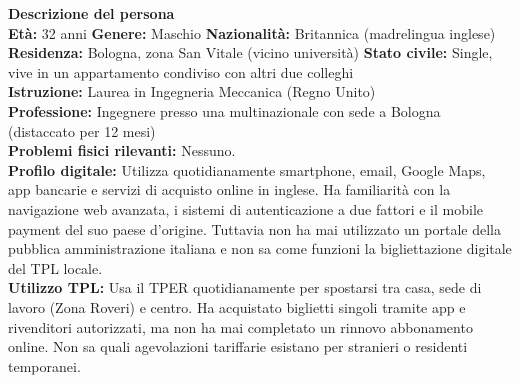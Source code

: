 ﻿\documentclass[11pt,a4paper]{article}
\begin{document}
\begin{tcolorbox}[base]
    \textbf{Descrizione del persona} \\[4pt]
    {\small
    \textbf{Et\`a:} 32 anni \hfill
    \textbf{Genere:} Maschio \hfill
    \textbf{Nazionalit\`a:} Britannica (madrelingua inglese) \\[2pt]
    \textbf{Residenza:} Bologna, zona San Vitale (vicino universit\`a) \hfill
    \textbf{Stato civile:} Single, vive in un appartamento condiviso con altri due colleghi \\[2pt]
    \textbf{Istruzione:} Laurea in Ingegneria Meccanica (Regno Unito) \\[2pt]
    \textbf{Professione:} Ingegnere presso una multinazionale con sede a Bologna (distaccato per 12 mesi) \\[2pt]
    \textbf{Problemi fisici rilevanti:} Nessuno. \\[2pt]
    \textbf{Profilo digitale:} Utilizza quotidianamente smartphone, email, Google Maps, app bancarie e servizi di acquisto online in inglese. Ha familiarit\`a con la navigazione web avanzata, i sistemi di autenticazione a due fattori e il mobile payment del suo paese d'origine. Tuttavia non ha mai utilizzato un portale della pubblica amministrazione italiana e non sa come funzioni la bigliettazione digitale del TPL locale. \\[2pt]
    \textbf{Utilizzo TPL:} Usa il TPER quotidianamente per spostarsi tra casa, sede di lavoro (Zona Roveri) e centro. Ha acquistato biglietti singoli tramite app e rivenditori autorizzati, ma non ha mai completato un rinnovo abbonamento online. Non sa quali agevolazioni tariffarie esistano per stranieri o residenti temporanei.
    }
\end{tcolorbox}

\newpage

\end{document}
